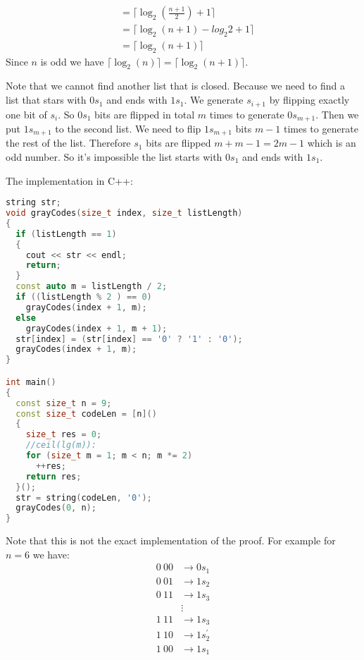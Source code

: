 \documentclass{book}
\begin{document}
\begin{itemize}
\begin{itemize}
\begin{equation*}
\begin{split}
					&= \lceil \log_2{(\frac{n + 1}{2})} + 1 \rceil \\
					&= \lceil \log_2{(n + 1)} - log_2{2} + 1 \rceil \\
					&= \lceil \log_2{(n + 1)} \rceil
				\end{split}
			\end{equation*}
		Since $n$ is odd we have $\lceil \log_2{(n)} \rceil = \lceil \log_2{(n + 1)} \rceil$.
		\par Note that we cannot find another list that is closed. Because we need to find a list that stars with $0s_1$ and ends with $1s_1$. We generate $s_{i + 1}$ by flipping exactly one bit of $s_i$. So $0s_1$ bits are flipped in total $m$ times to generate $0s_{m + 1}$. Then we put $1s_{m + 1}$ to the second list. We need to flip $1s_{m + 1}$ bits $m - 1$ times to generate the rest of the list. Therefore $s_1$ bits are flipped $m + m - 1 = 2m - 1$ which is an odd number. So it's impossible the list starts with $0s_1$ and ends with $1s_1$.
		\end{itemize}
	\end{itemize}
	The implementation in C++:
	\begin{lstlisting}[language=c++, frame=single]
string str;
void grayCodes(size_t index, size_t listLength)
{
  if (listLength == 1)
  {
    cout << str << endl;
    return;
  }
  const auto m = listLength / 2;
  if ((listLength % 2 ) == 0)
    grayCodes(index + 1, m);
  else
    grayCodes(index + 1, m + 1);
  str[index] = (str[index] == '0' ? '1' : '0');
  grayCodes(index + 1, m);
}

int main()
{
  const size_t n = 9;
  const size_t codeLen = [n]()
  {
    size_t res = 0;
    //ceil(lg(m)):
    for (size_t m = 1; m < n; m *= 2)
      ++res;
    return res;
  }();
  str = string(codeLen, '0');
  grayCodes(0, n);
}
	\end{lstlisting}
	Note that this is not the exact implementation of the proof. For example for $n = 6$ we have:
	\begin{equation*}
		\begin{split}
			0\ 00 &\rightarrow 0s_1 \\
			0\ 01 &\rightarrow 1s_2 \\
			0\ 11 &\rightarrow 1s_3 \\
			&\vdots \\
			1\ 11 &\rightarrow 1s_3 \\
			1\ 10 &\rightarrow 1s_2^{\prime} \\
			1\ 00 &\rightarrow 1s_1 \\			
		\end{split}
	\end{equation*}
\end{document}
